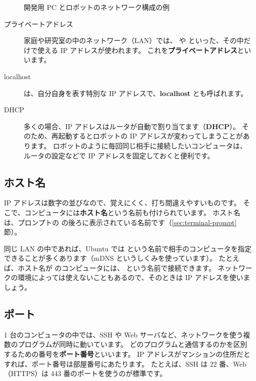 \begin{figure}[tb]
  \centering
  
  \caption{開発用 PC とロボットのネットワーク構成の例}
  \label{fig:network-robot}
\end{figure}

\begin{description}
  \item[プライベートアドレス]
    家庭や研究室の中のネットワーク（LAN）では、 や  といった、その中だけで使える IP アドレスが使われます。
    これを\textbf{プライベートアドレス}といいます。
  \item[localhost]
     は、自分自身を表す特別な IP アドレスで、\textbf{localhost} とも呼ばれます。
  \item[DHCP]
    多くの場合、IP アドレスはルータが自動で割り当てます（\textbf{DHCP}）。
    そのため、再起動するとロボットの IP アドレスが変わってしまうことがあります。
    ロボットのように毎回同じ相手に接続したいコンピュータは、ルータの設定などで IP アドレスを固定しておくと便利です。
\end{description}

\subsection{ホスト名}

IP アドレスは数字の並びなので、覚えにくく、打ち間違えやすいものです。
そこで、コンピュータには\textbf{ホスト名}という名前も付けられています。
ホスト名は、プロンプトの  の後ろに表示されている名前です（\ref{sec:terminal-prompt}節）。

同じ LAN の中であれば、Ubuntu では  という名前で相手のコンピュータを指定できることが多くあります（mDNS というしくみを使っています）。
たとえば、ホスト名が  のコンピュータには、 という名前で接続できます。
ネットワークの環境によっては使えないこともあるので、そのときは IP アドレスを使いましょう。

\subsection{ポート}

1 台のコンピュータの中では、SSH や Web サーバなど、ネットワークを使う複数のプログラムが同時に動いています。
どのプログラムと通信するのかを区別するための番号を\textbf{ポート番号}といいます。
IP アドレスがマンションの住所だとすれば、ポート番号は部屋番号にあたります。
たとえば、SSH は 22 番、Web（HTTPS）は 443 番のポートを使うのが標準です。

